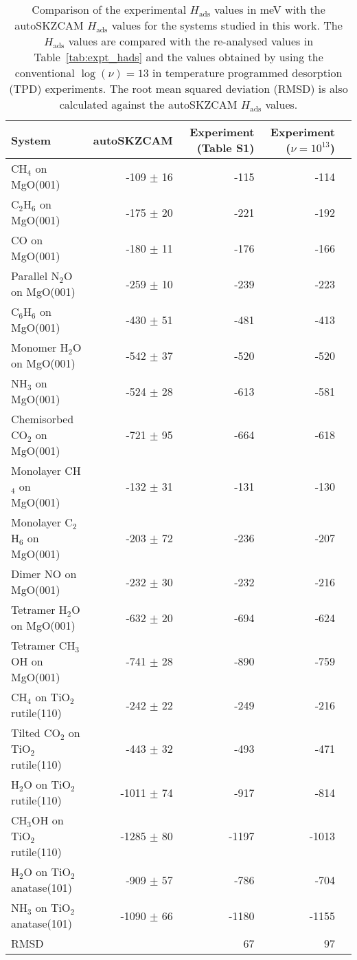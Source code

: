 \begin{table}
\caption{\label{tab:hads_nu13_comparison}Comparison of the experimental $H_\textrm{ads}$ values in meV with the autoSKZCAM $H_\textrm{ads}$ values for the systems studied in this work. The $H_\textrm{ads}$ values are compared with the re-analysed values in Table~\ref{tab:expt_hads} and the values obtained by using the conventional $\log(\nu)=13$ in temperature programmed desorption (TPD) experiments. The root mean squared deviation (RMSD) is also calculated against the autoSKZCAM $H_\textrm{ads}$ values.}
\begin{adjustbox}{center,max width=1\textwidth}
\begin{tabular}{lrrrr}
\toprule
System & autoSKZCAM & Experiment (Table S1) & Experiment ($\nu{=}10^{13}$) \\ 
\midrule
CH$_4$ on MgO(001) & -109 $\pm$ 16 & -115 & -114 \\
C$_2$H$_6$ on MgO(001) & -175 $\pm$ 20 & -221 & -192 \\
CO on MgO(001) & -180 $\pm$ 11 & -176 & -166 \\
Parallel N$_2$O on MgO(001) & -259 $\pm$ 10 & -239 & -223 \\
C$_6$H$_6$ on MgO(001) & -430 $\pm$ 51 & -481 & -413 \\
Monomer H$_2$O on MgO(001) & -542 $\pm$ 37 & -520 & -520 \\
NH$_3$ on MgO(001) & -524 $\pm$ 28 & -613 & -581 \\
Chemisorbed CO$_2$ on MgO(001) & -721 $\pm$ 95 & -664 & -618 \\
Monolayer CH$_4$ on MgO(001) & -132 $\pm$ 31 & -131 & -130 \\
Monolayer C$_2$H$_6$ on MgO(001) & -203 $\pm$ 72 & -236 & -207 \\
Dimer NO on MgO(001) & -232 $\pm$ 30 & -232 & -216 \\
Tetramer H$_2$O on MgO(001) & -632 $\pm$ 20 & -694 & -624 \\
Tetramer CH$_3$OH on MgO(001) & -741 $\pm$ 28 & -890 & -759 \\
CH$_4$ on TiO$_2$ rutile(110) & -242 $\pm$ 22 & -249 & -216 \\
Tilted CO$_2$ on TiO$_2$ rutile(110) & -443 $\pm$ 32 & -493 & -471 \\
H$_2$O on TiO$_2$ rutile(110) & -1011 $\pm$ 74 & -917 & -814 \\
CH$_3$OH on TiO$_2$ rutile(110) & -1285 $\pm$ 80 & -1197 & -1013 \\
H$_2$O on TiO$_2$ anatase(101) & -909 $\pm$ 57 & -786 & -704 \\
NH$_3$ on TiO$_2$ anatase(101) & -1090 $\pm$ 66 & -1180 & -1155 \\
RMSD &  & 67 & 97 \\
\bottomrule
\end{tabular}
\end{adjustbox}
\end{table}